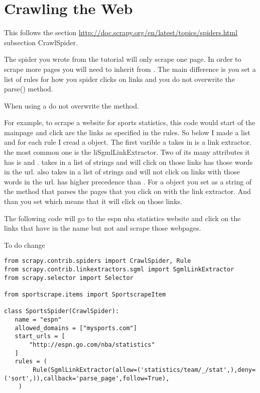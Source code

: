 {\section*{Crawling the Web}
This follows the section \url{http://doc.scrapy.org/en/latest/topics/spiders.html} subsection CrawlSpider.

The spider you wrote from the tutorial will only scrape one page. In order to scrape more pages you will need to inherit from . The main difference is you set a list of rules for how you spider clicks on links and you do not overwrite the parse() method.

\begin{warn}
When using a  do not overwrite the  method.
\end{warn}

For example, to scrape a website for sports statistics, this code would start of the mainpage and click are the links as specified in the rules. So below I made a list and for each rule I cread a  object. The first varible a takes in is a link extractor. the most common one is the li{SgmlLinkExtractor}. Two of its many attributes it has is  and .  takes in a list of strings and will click on those links has those words in the url.  also takes in a list of strings and will not click on links with those words in the url.  has higher precedence than . For a  object you set  as a string of the method that parses the pages that you click on with the link extractor.  And than you set  which means that it will click on those links.

The following code will go to the espn nba statistics website and click on the links that have  in the name but not  and scrape those webpages.

To do change
\begin{lstlisting}
from scrapy.contrib.spiders import CrawlSpider, Rule
from scrapy.contrib.linkextractors.sgml import SgmlLinkExtractor
from scrapy.selector import Selector

from sportscrape.items import SportscrapeItem

class SportsSpider(CrawlSpider):
   name = "espn"
   allowed_domains = ["mysports.com"]
   start_urls = [
       "http://espn.go.com/nba/statistics"
   ]
   rules = (
        Rule(SgmlLinkExtractor(allow=('statistics/team/_/stat',),deny=('sort',)),callback='parse_page',follow=True),
    )


\end{lstlisting}}
